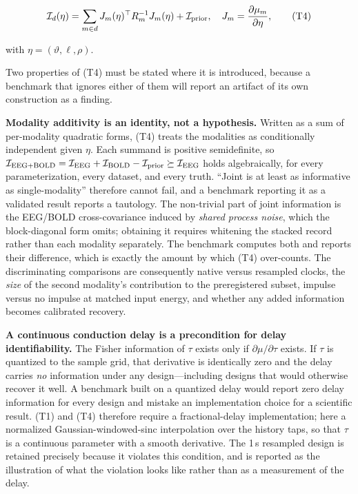 \[
\mathcal I_d(\eta)=
\sum_{m\in d}J_m(\eta)^\top R_m^{-1}J_m(\eta)
+\mathcal I_{\rm prior},
\quad
J_m=\frac{\partial\mu_m}{\partial\eta},
\tag{T4}
\]

with \(\eta=(\vartheta,\ell,\rho)\).

Two properties of (T4) must be stated where it is introduced, because a
benchmark that ignores either of them will report an artifact of its own
construction as a finding.

\textbf{Modality additivity is an identity, not a hypothesis.} Written as a sum
of per-modality quadratic forms, (T4) treats the modalities as conditionally
independent given \(\eta\). Each summand is positive semidefinite, so
\(\mathcal I_{\rm EEG+BOLD}
=\mathcal I_{\rm EEG}+\mathcal I_{\rm BOLD}-\mathcal I_{\rm prior}
\succeq\mathcal I_{\rm EEG}\)
holds algebraically, for every parameterization, every dataset, and every
truth. ``Joint is at least as informative as single-modality'' therefore cannot
fail, and a benchmark reporting it as a validated result reports a tautology.
The non-trivial part of joint information is the EEG/BOLD cross-covariance
induced by \emph{shared process noise}, which the block-diagonal form omits;
obtaining it requires whitening the stacked record rather than each modality
separately. The benchmark computes both and reports their difference, which is
exactly the amount by which (T4) over-counts. The discriminating comparisons
are consequently native versus resampled clocks, the \emph{size} of the second
modality's contribution to the preregistered subset, impulse versus no impulse
at matched input energy, and whether any added information becomes calibrated
recovery.

\textbf{A continuous conduction delay is a precondition for delay
identifiability.} The Fisher information of \(\tau\) exists only if
\(\partial\mu/\partial\tau\) exists. If \(\tau\) is quantized to the sample
grid, that derivative is identically zero and the delay carries \emph{no}
information under any design---including designs that would otherwise recover
it well. A benchmark built on a quantized delay would report zero delay
information for every design and mistake an implementation choice for a
scientific result. (T1) and (T4) therefore require a fractional-delay
implementation; here a normalized Gaussian-windowed-sinc interpolation over the
history taps, so that \(\tau\) is a continuous parameter with a smooth
derivative. The 1\,s resampled design is retained precisely because it violates
this condition, and is reported as the illustration of what the violation looks
like rather than as a measurement of the delay.

